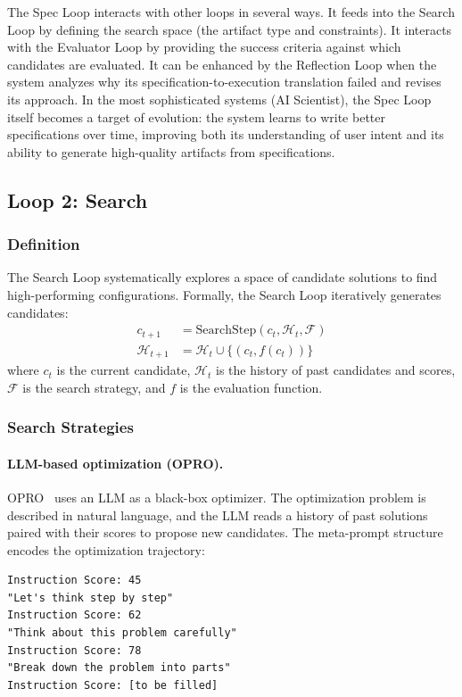 The Spec Loop interacts with other loops in several ways. It feeds into the Search Loop by defining the search space (the artifact type and constraints). It interacts with the Evaluator Loop by providing the success criteria against which candidates are evaluated. It can be enhanced by the Reflection Loop when the system analyzes why its specification-to-execution translation failed and revises its approach. In the most sophisticated systems (AI Scientist), the Spec Loop itself becomes a target of evolution: the system learns to write better specifications over time, improving both its understanding of user intent and its ability to generate high-quality artifacts from specifications.


\subsection{Loop 2: Search}
\label{sec:search-loop}

\subsubsection{Definition}

The Search Loop systematically explores a space of candidate solutions to find high-performing configurations. Formally, the Search Loop iteratively generates candidates:
\begin{align}
    c_{t+1} &= \text{SearchStep}(c_t, \mathcal{H}_t, \mathcal{F}) \\
    \mathcal{H}_{t+1} &= \mathcal{H}_t \cup \{(c_t, f(c_t))\}
\end{align}
where $c_t$ is the current candidate, $\mathcal{H}_t$ is the history of past candidates and scores, $\mathcal{F}$ is the search strategy, and $f$ is the evaluation function.

\subsubsection{Search Strategies}

\paragraph{LLM-based optimization (OPRO).}
OPRO~\citep{yang2023opro} uses an LLM as a black-box optimizer. The optimization problem is described in natural language, and the LLM reads a history of past solutions paired with their scores to propose new candidates. The meta-prompt structure encodes the optimization trajectory:
\begin{verbatim}
Instruction Score: 45
"Let's think step by step"
Instruction Score: 62
"Think about this problem carefully"
Instruction Score: 78
"Break down the problem into parts"
Instruction Score: [to be filled]
\end{verbatim}

